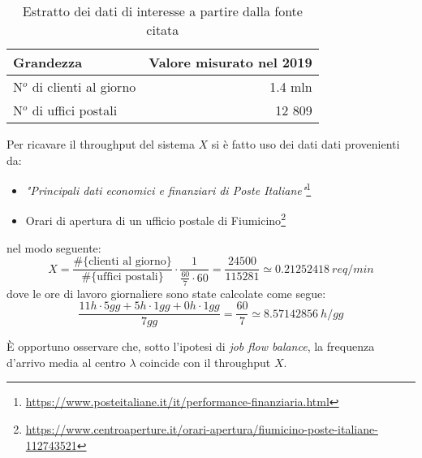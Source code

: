 \begin{table}[ht]
\centering
{\tablecolors
\begin{tabular}{| l | r |}
\hline
Grandezza & Valore misurato nel 2019 \\
\hline
N$^o$ di clienti al giorno & 1.4 mln \\
\hline
N$^o$ di uffici postali & 12 809 \\
\hline
\end{tabular}}
\caption{Estratto dei dati di interesse a partire dalla fonte citata}
\label{table:modello-specifiche-2}
\end{table}

Per ricavare il throughput del sistema $X$ si è fatto uso dei dati dati provenienti da:
\begin{itemize}
\item \textsl{"Principali dati economici e finanziari di Poste Italiane"}\footnote{\url{https://www.posteitaliane.it/it/performance-finanziaria.html}}
\item Orari di apertura di un ufficio postale di Fiumicino\footnote{\url{https://www.centroaperture.it/orari-apertura/fiumicino-poste-italiane-112743521}}
\end{itemize}
nel modo seguente:
\begin{equation}
X = \frac{\# \lbrace \text{clienti al giorno} \rbrace}{\# \lbrace \text{uffici postali} \rbrace} \cdot \frac{1}{\frac{60}{7} \cdot 60} = \frac{24500}{115281} \simeq 0.21252418\ req/min
\end{equation} 
dove le ore di lavoro giornaliere sono state calcolate come segue:
\begin{equation}
\frac{11h \cdot 5gg + 5h \cdot 1gg + 0h \cdot 1gg}{7gg} = \frac{60}{7} \simeq 8.57142856\ h/gg  
\end{equation}

È opportuno osservare che, sotto l'ipotesi di \textsl{job flow balance}, la frequenza d'arrivo media al centro $\lambda$ coincide con il throughput $X$.


















